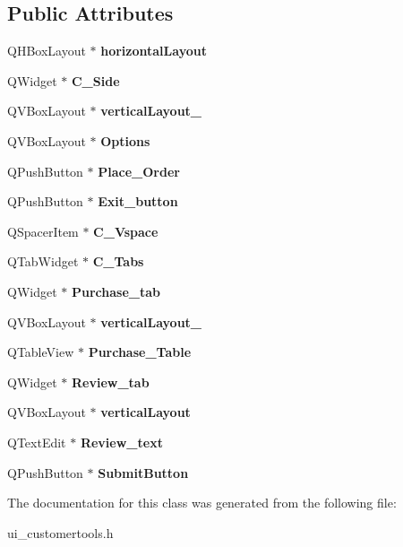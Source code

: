 \subsection*{Public Attributes}
\begin{DoxyCompactItemize}
\item 
\mbox{\label{class_ui__customer_tools_a2a1c615bb9902bc4d4fbfd079fce97ba}} 
Q\+H\+Box\+Layout $\ast$ {\bfseries horizontal\+Layout}
\item 
\mbox{\label{class_ui__customer_tools_aa5347e23bc21522a864e532531c3db25}} 
Q\+Widget $\ast$ {\bfseries C\+\_\+\+Side}
\item 
\mbox{\label{class_ui__customer_tools_a8438208618625686e633c85ecf67f678}} 
Q\+V\+Box\+Layout $\ast$ {\bfseries vertical\+Layout\+\_}
\item 
\mbox{\label{class_ui__customer_tools_aaeb701ba99739625b9c49bda78af24b2}} 
Q\+V\+Box\+Layout $\ast$ {\bfseries Options}
\item 
\mbox{\label{class_ui__customer_tools_af6b50b358bc1c67441ce5977484101f4}} 
Q\+Push\+Button $\ast$ {\bfseries Place\+\_\+\+Order}
\item 
\mbox{\label{class_ui__customer_tools_a643daa1e7c3791a6868dbf2dbd5c95b5}} 
Q\+Push\+Button $\ast$ {\bfseries Exit\+\_\+button}
\item 
\mbox{\label{class_ui__customer_tools_aa9bd4a63317b370bafcdc2a341b01306}} 
Q\+Spacer\+Item $\ast$ {\bfseries C\+\_\+\+Vspace}
\item 
\mbox{\label{class_ui__customer_tools_ae6ed531b95fb5f6d488aa18d810c9ee7}} 
Q\+Tab\+Widget $\ast$ {\bfseries C\+\_\+\+Tabs}
\item 
\mbox{\label{class_ui__customer_tools_ae1b5c2955f1a22b531949cc0a086015a}} 
Q\+Widget $\ast$ {\bfseries Purchase\+\_\+tab}
\item 
\mbox{\label{class_ui__customer_tools_aac28503854008637ae985dd22d2fee1b}} 
Q\+V\+Box\+Layout $\ast$ {\bfseries vertical\+Layout\+\_}
\item 
\mbox{\label{class_ui__customer_tools_a5ce62c93b65b90dbfe715febe29789b6}} 
Q\+Table\+View $\ast$ {\bfseries Purchase\+\_\+\+Table}
\item 
\mbox{\label{class_ui__customer_tools_a56e5fa59d180983139197a1ff783ff03}} 
Q\+Widget $\ast$ {\bfseries Review\+\_\+tab}
\item 
\mbox{\label{class_ui__customer_tools_aa127084d8aa349764008781139f84759}} 
Q\+V\+Box\+Layout $\ast$ {\bfseries vertical\+Layout}
\item 
\mbox{\label{class_ui__customer_tools_a5b8eb2640b950f61ca09759e78b10e02}} 
Q\+Text\+Edit $\ast$ {\bfseries Review\+\_\+text}
\item 
\mbox{\label{class_ui__customer_tools_a9c5143ea59231ca03e5cef349dfe4d4c}} 
Q\+Push\+Button $\ast$ {\bfseries Submit\+Button}
\end{DoxyCompactItemize}


The documentation for this class was generated from the following file\+:\begin{DoxyCompactItemize}
\item 
ui\+\_\+customertools.\+h\end{DoxyCompactItemize}
